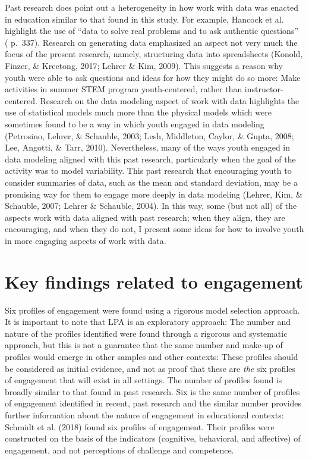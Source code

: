 \documentclass[]{msu-thesis}
\theoremstyle{definition}
\theoremstyle{definition}
\theoremstyle{definition}
\theoremstyle{remark}
\begin{document}
Past research does point out a heterogeneity in how work with data was
enacted in education similar to that found in this study. For example,
Hancock et al. highlight the use of ``data to solve real problems and to
ask authentic questions'' ( p.~337). Research on generating data
emphasized an aspect not very much the focus of the present research,
namely, structuring data into spreadsheets (Konold, Finzer, \& Kreetong,
2017; Lehrer \& Kim, 2009). This suggests a reason why youth were able
to ask questions and ideas for how they might do so more: Make
activities in summer STEM program youth-centered, rather than
instructor-centered. Research on the data modeling aspect of work with
data highlights the use of statistical models much more than the
physical models which were sometimes found to be a way in which youth
engaged in data modeling (Petrosino, Lehrer, \& Schauble, 2003; Lesh,
Middleton, Caylor, \& Gupta, 2008; Lee, Angotti, \& Tarr, 2010).
Nevertheless, many of the ways youth engaged in data modeling aligned
with this past research, particularly when the goal of the activity was
to model variability. This past research that encouraging youth to
consider summaries of data, such as the mean and standard deviation, may
be a promising way for them to engage more deeply in data modeling
(Lehrer, Kim, \& Schauble, 2007; Lehrer \& Schauble, 2004). In this way,
some (but not all) of the aspects work with data aligned with past
research; when they align, they are encouraging, and when they do not, I
present some ideas for how to involve youth in more engaging aspects of
work with data.

\section{Key findings related to
engagement}\label{key-findings-related-to-engagement}

Six profiles of engagement were found using a rigorous model selection
approach. It is important to note that LPA is an exploratory approach:
The number and nature of the profiles identified were found through a
rigorous and systematic approach, but this is not a guarantee that the
same number and make-up of profiles would emerge in other samples and
other contexts: These profiles should be considered as initial evidence,
and not as proof that these are \emph{the} six profiles of engagement
that will exist in all settings. The number of profiles found is broadly
similar to that found in past research. Six is the same number of
profiles of engagement identified in recent, past research and the
similar number provides further information about the nature of
engagement in educational contexts: Schmidt et al. (2018) found six
profiles of engagement. Their profiles were constructed on the basis of
the indicators (cognitive, behavioral, and affective) of engagement, and
not perceptions of challenge and competence.
\end{document}
